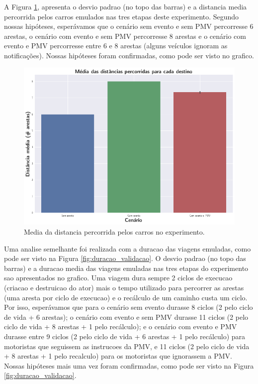 A Figura \ref{fig:distancia_validacao}, apresenta o desvio padrao (no topo das barras) e a distancia media percorrida pelos carros emulados nas tres etapas deste experimento.
Segundo nossas hipóteses, esperávamos que o cenário sem evento e sem PMV percorresse 6 arestas, o cenário com evento e sem PMV percorresse 8 arestas e o cenário com evento e PMV percorresse
entre 6 e 8 arestas (alguns veículos ignoram as notificações).
Nossas hipóteses foram confirmadas, como pode ser visto no grafico.

\begin{figure}[ht]
	\centering
	\includegraphics[width=.8\textwidth]{figuras/distancia_validacao.png}
	\caption{Media da distancia percorrida pelos carros no experimento.}
	\label{fig:distancia_validacao}
\end{figure}

Uma analise semelhante foi realizada com a duracao das viagens emuladas, como pode ser visto na Figura \ref{fig:duracao_validacao}.
O desvio padrao (no topo das barras) e a duracao media das viagens emuladas nas tres etapas do experimento sao apresentados no grafico.
Uma viagem dura sempre 2 ciclos de execucao (criacao e destruicao do ator) mais o tempo utilizado para percorrer as arestas (uma aresta por ciclo de execucao) e o recálculo de um caminho custa um ciclo.
Por isso, esperávamos que para o cenário sem evento durasse 8 ciclos (2 pelo ciclo de vida + 6 arestas);
o cenário com evento e sem PMV durasse 11 ciclos (2 pelo ciclo de vida + 8 arestas + 1 pelo recálculo);
e o cenário com evento e PMV durasse entre 9 ciclos (2 pelo ciclo de vida + 6 arestas + 1 pelo recálculo) para motoristas que seguissem as instrucoes da PMV, e 11 ciclos (2 pelo ciclo de vida + 8 arestas +
1 pelo recalculo) para os motoristas que ignorassem a PMV.
Nossas hipóteses mais uma vez foram confirmadas, como pode ser visto na Figura \ref{fig:duracao_validacao}.

